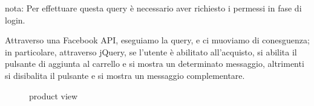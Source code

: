nota: Per effettuare questa query è necessario aver richiesto i permessi in fase di login. 

Attraverso una Facebook API, eseguiamo la query, e ci muoviamo di conesguenza; in particolare, attraverso jQuery, se l'utente è abilitato all'acquisto, si abilita il pulsante di aggiunta al carrello e si mostra un determinato messaggio, altrimenti si disibalita il pulsante e si mostra un messaggio complementare.
\begin{figure}
\centering
{}
\hspace{5mm}
\caption{product view}
\end{figure}
